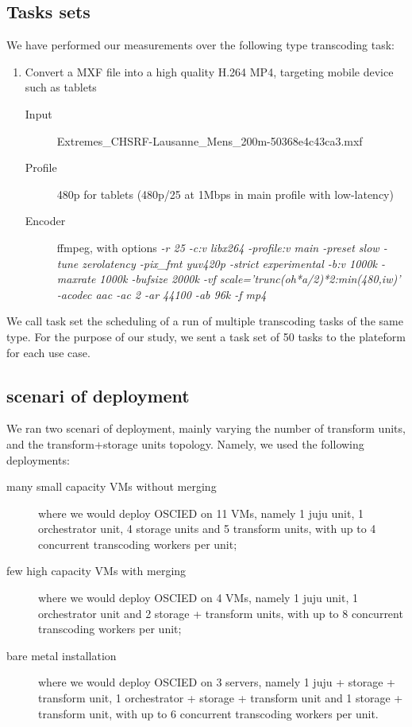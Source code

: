 \documentclass[a4paper, titlepage]{paper}
\numberwithin{figure}{section}
\numberwithin{table}{section}
\begin{document}
    \subsection{Tasks sets}
      We have performed our measurements over the following type transcoding task:
      \begin{enumerate}
        \item Convert a MXF file into a high quality H.264 MP4, targeting mobile device such as tablets
        \begin{description}
            \item[Input] Extremes\_CHSRF-Lausanne\_Mens\_200m-50368e4c43ca3.mxf
            \item[Profile] 480p for tablets (480p/25 at 1Mbps in main
profile with low-latency)
            \item[Encoder] ffmpeg, with options \emph{-r 25 -c:v libx264 -profile:v main -preset slow -tune zerolatency -pix\_fmt yuv420p -strict experimental -b:v 1000k - maxrate 1000k -bufsize 2000k -vf scale='trunc(oh*a/2)*2:min(480,iw)' -acodec aac -ac 2 -ar 44100 -ab 96k -f mp4}
        \end{description}
      \end{enumerate}

      We call task set the scheduling of a run of multiple transcoding tasks of the same type. For the purpose of our study, we sent a task set of 50 tasks to the plateform for each use case.

    \subsection{scenari of deployment}
      We ran two scenari of deployment, mainly varying the number of transform units, and the transform+storage units topology. Namely, we used the following deployments:

      \begin{description}
          \item[many small capacity VMs without merging] where we would deploy OSCIED on 11 VMs, namely 1 juju unit, 1 orchestrator unit, 4 storage units and 5 transform units, with up to 4 concurrent transcoding workers per unit;
          \item[few high capacity VMs with merging] where we would deploy OSCIED on 4 VMs, namely 1 juju unit, 1 orchestrator unit and 2 storage + transform units, with up to 8 concurrent transcoding workers per unit;
          \item[bare metal installation] where we would deploy OSCIED on 3 servers, namely 1 juju + storage + transform unit, 1 orchestrator + storage + transform unit and 1 storage + transform unit, with up to 6 concurrent transcoding workers per unit.
      \end{description}
\end{document}

